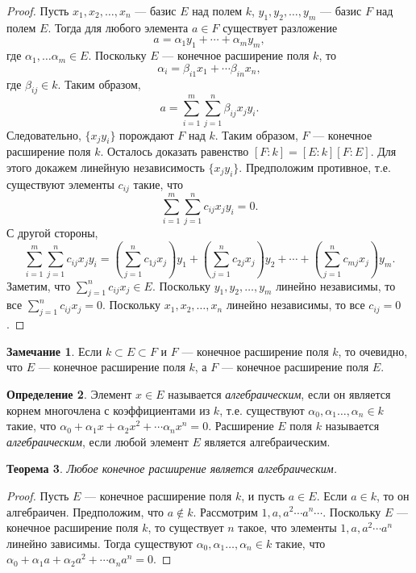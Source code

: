 \documentclass[12pt, titlepage, oneside]{amsbook}
\newtheorem{theorem}{Теорема}[chapter]
\theoremstyle{definition}
\newtheorem{definition}[theorem]{Определение}
\newtheorem{remark}[theorem]{Замечание}
\theoremstyle{remark}
\begin{document}
\begin{proof}
Пусть $x_1,x_2,\ldots, x_n$ --- базис $E$ над полем $k$, $y_1,y_2,\ldots, y_m$ --- базис $F$ над полем $E$. Тогда для любого элемента $a\in F$ существует разложение $$a=\alpha_1 y_1+\cdots+\alpha_m y_m,$$ где $\alpha_1,\ldots\alpha_m\in E$. Поскольку $E$ --- конечное расширение поля $k$, то $$\alpha_i=\beta_{i1}x_1+\cdots\beta_{in}x_n,$$ где $\beta_{ij}\in k$. Таким образом, $$a=\sum\limits_{i=1}^m\sum\limits_{j=1}^n\beta_{ij}x_jy_i.$$ Следовательно, $\{x_jy_i\}$ порождают $F$ над $k$. Таким образом, $F$ --- конечное расширение поля $k$. Осталось доказать равенство $[F:k]=[E:k][F:E]$. Для этого докажем линейную независимость $\{x_jy_i\}$. Предположим противное, т.е. существуют элементы $c_{ij}$ такие, что $$\sum\limits_{i=1}^m\sum\limits_{j=1}^n c_{ij}x_jy_i=0.$$ С другой стороны, $$\sum\limits_{i=1}^m\sum\limits_{j=1}^n c_{ij}x_jy_i=\left(\sum\limits_{j=1}^n c_{1j} x_j\right)y_1+\left(\sum\limits_{j=1}^n c_{2j} x_j\right)y_2+\cdots+\left(\sum\limits_{j=1}^n c_{mj} x_j\right)y_m.$$ Заметим, что $\sum\limits_{j=1}^n c_{ij} x_j\in E$. Поскольку $y_1,y_2,\ldots, y_m$ линейно независимы, то все $\sum\limits_{j=1}^n c_{ij} x_j=0$. Поскольку $x_1,x_2,\ldots, x_n$ линейно независимы, то все $c_{ij}=0$.
\end{proof}

\begin{remark}
Если $k\subset E\subset F$ и $F$ --- конечное расширение поля $k$, то очевидно, что $E$ --- конечное расширение поля $k$, а $F$ --- конечное расширение поля $E$.
\end{remark}

\begin{definition}
Элемент $x\in E$ называется \emph{алгебраическим}, если он является корнем многочлена с коэффициентами из $k$, т.е. существуют  $\alpha_0,\alpha_1\ldots,\alpha_n\in k$ такие, что $\alpha_0+\alpha_1 x+\alpha_2 x^2+\cdots\alpha_n x^n=0.$
Расширение $E$  поля $k$ называется \emph{алгебраическим}, если любой элемент $E$ является алгебраическим.
\end{definition}

\begin{theorem}
\label{Ras2} Любое конечное расширение является алгебраическим.
\end{theorem}

\begin{proof}
Пусть $E$ --- конечное расширение поля $k$, и пусть $a\in E$. Если $a\in k$, то он алгебраичен. Предположим, что $a\not\in k$. Рассмотрим $1,a,a^2\cdots a^n\cdots$. Поскольку $E$ --- конечное расширение поля $k$, то существует $n$ такое, что элементы $1,a,a^2\cdots a^n$ линейно зависимы. Тогда существуют  $\alpha_0,\alpha_1\ldots,\alpha_n\in k$ такие, что $\alpha_0+\alpha_1 a+\alpha_2 a^2+\cdots\alpha_n a^n=0.$
\end{proof}
\end{document}

